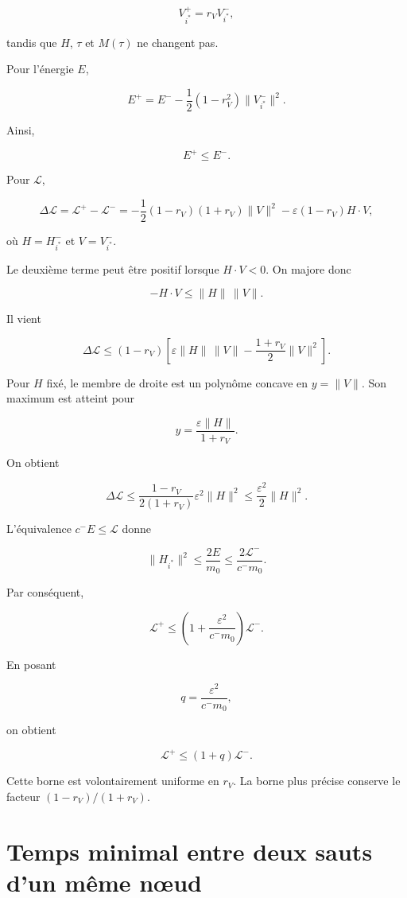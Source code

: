 \[
V_{i^\ast}^+=r_VV_{i^\ast}^-,
\]

tandis que \(H\), \(\tau\) et \(M(\tau)\) ne changent pas.

Pour l'énergie \(E\),

\[
E^+
=
E^-
-
\frac12(1-r_V^2)
\|V_{i^\ast}^-\|^2.
\]

Ainsi,

\[
\boxed{E^+\leq E^-}.
\]

Pour \(\mathcal L\),

\[
\Delta\mathcal L
=
\mathcal L^+-\mathcal L^-
=
-\frac12(1-r_V)(1+r_V)\|V\|^2
-
\varepsilon(1-r_V)H\cdot V,
\]

où \(H=H_{i^\ast}^-\) et \(V=V_{i^\ast}^-\).

Le deuxième terme peut être positif lorsque \(H\cdot V<0\). On majore
donc

\[
-H\cdot V
\leq
\|H\|\,\|V\|.
\]

Il vient

\[
\Delta\mathcal L
\leq
(1-r_V)
\left[
\varepsilon\|H\|\,\|V\|
-
\frac{1+r_V}{2}\|V\|^2
\right].
\]

Pour \(H\) fixé, le membre de droite est un polynôme concave en
\(y=\|V\|\). Son maximum est atteint pour

\[
y
=
\frac{\varepsilon\|H\|}{1+r_V}.
\]

On obtient

\[
\Delta\mathcal L
\leq
\frac{1-r_V}{2(1+r_V)}
\varepsilon^2\|H\|^2
\leq
\frac{\varepsilon^2}{2}\|H\|^2.
\]

L'équivalence \(c^{-}E\leq\mathcal L\) donne

\[
\|H_{i^\ast}\|^2
\leq
\frac{2E}{m_0}
\leq
\frac{2\mathcal L^-}{c^{-}m_0}.
\]

Par conséquent,

\[
\mathcal L^+
\leq
\left(
1+
\frac{\varepsilon^2}{c^{-}m_0}
\right)
\mathcal L^-.
\]

En posant

\[
q
=
\frac{\varepsilon^2}{c^{-}m_0},
\]

on obtient

\[
\boxed{
\mathcal L^+
\leq
(1+q)\mathcal L^-
}.
\]

Cette borne est volontairement uniforme en \(r_V\). La borne plus
précise conserve le facteur \((1-r_V)/(1+r_V)\).

\section{Temps minimal entre deux sauts d'un même nœud}
\label{annexe-energie-temps-sejour}

